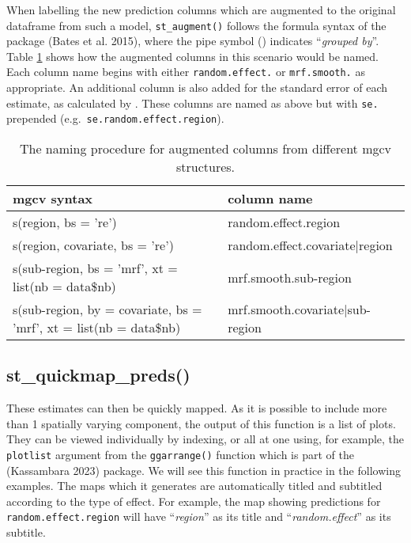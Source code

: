 When labelling the new prediction columns which are augmented to the original dataframe from such a model, \texttt{st\_augment()} follows the formula syntax of the  package (Bates et al. 2015), where the pipe symbol (\texttt{\textbar{}}) indicates ``\emph{grouped by}''. Table \ref{tab:staugtab-latex} shows how the augmented columns in this scenario would be named. Each column name begins with either \texttt{random.effect.} or \texttt{mrf.smooth.} as appropriate. An additional column is also added for the standard error of each estimate, as calculated by . These columns are named as above but with \texttt{se.} prepended (e.g.~\texttt{se.random.effect.region}).

\begin{table}

\caption{\label{tab:staugtab-latex}The naming procedure for augmented columns from different mgcv structures.}
\centering
\fontsize{9}{11}\selectfont
\begin{tabular}[t]{l|l}
\hline
\textbf{mgcv syntax} & \textbf{column name}\\
\hline
s(region, bs = 're') & random.effect.region\\
\hline
s(region, covariate, bs = 're') & random.effect.covariate|region\\
\hline
s(sub-region, bs = 'mrf', xt = list(nb = data\$nb) & mrf.smooth.sub-region\\
\hline
s(sub-region, by = covariate, bs = 'mrf', xt = list(nb = data\$nb) & mrf.smooth.covariate|sub-region\\
\hline
\end{tabular}
\end{table}

\hypertarget{st_quickmap_preds}{%
\subsection{st\_quickmap\_preds()}\label{st_quickmap_preds}}

These estimates can then be quickly mapped. As it is possible to include more than 1 spatially varying component, the output of this function is a list of plots. They can be viewed individually by indexing, or all at one using, for example, the \texttt{plotlist} argument from the \texttt{ggarrange()} function which is part of the  (Kassambara 2023) package. We will see this function in practice in the following examples. The maps which it generates are automatically titled and subtitled according to the type of effect. For example, the map showing predictions for \texttt{random.effect.region} will have ``\emph{region}'' as its title and ``\emph{random.effect}'' as its subtitle.

